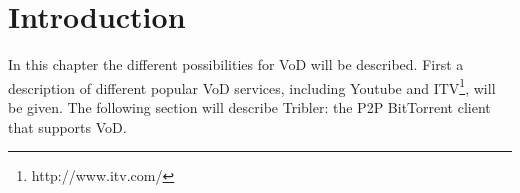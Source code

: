 \section{Introduction}
In this chapter the different possibilities for VoD will be described. First a description of different popular VoD services, including Youtube and ITV\footnote{http://www.itv.com/}, will be given. The following section will describe Tribler: the P2P BitTorrent client that supports VoD. 

